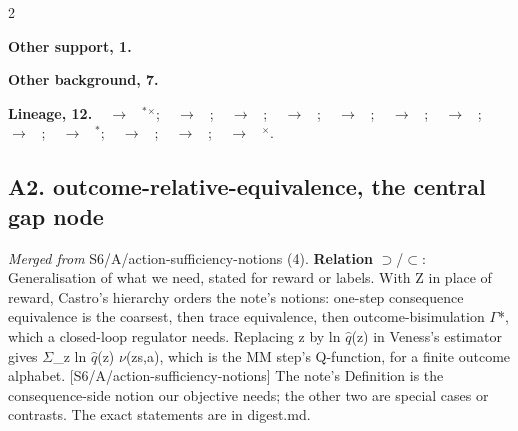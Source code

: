 \documentclass[10pt]{article}
\newcommand{\memb}[1]{\par\smallskip\textbf{#1}\quad}
\begin{document}
\begin{multicols}{2}
\memb{Other support, 1.} \citetext{\citealp{Chen-counterfactual26}}

\memb{Other background, 7.} {\footnotesize \citetext{\citealp{Boutilier-decisiontheoretic99}; \citealp{Boutilier-stochastic00}; \citealp{Soatto-steps11}; \citealp{Baram-deep16}; \citealp{Corneil-efficient18}; \citealp{Biza-learning20}; \citealp{An-diagnosing26}}}

\end{multicols}
\memb{Lineage, 12.} {\footnotesize \citeauthor{Conant-good70}~\citeyear{Conant-good70} $\to$ \citeauthor{Li-towards06}~\citeyear{Li-towards06}$^\ast$$^\times$; \citeauthor{Larsen-bisimulation91}~\citeyear{Larsen-bisimulation91} $\to$ \citeauthor{Desharnais-bisimulation02}~\citeyear{Desharnais-bisimulation02}; \citeauthor{Larsen-bisimulation91}~\citeyear{Larsen-bisimulation91} $\to$ \citeauthor{Givan-equivalence03}~\citeyear{Givan-equivalence03}; \citeauthor{Givan-equivalence03}~\citeyear{Givan-equivalence03} $\to$ \citeauthor{Ferns-metrics04}~\citeyear{Ferns-metrics04}; \citeauthor{Givan-equivalence03}~\citeyear{Givan-equivalence03} $\to$ \citeauthor{Li-towards06}~\citeyear{Li-towards06}; \citeauthor{Ferns-metrics04}~\citeyear{Ferns-metrics04} $\to$ \citeauthor{Castro-equivalence09}~\citeyear{Castro-equivalence09}; \citeauthor{Ferns-metrics04}~\citeyear{Ferns-metrics04} $\to$ \citeauthor{Zhang-learning21}~\citeyear{Zhang-learning21}; \citeauthor{Li-towards06}~\citeyear{Li-towards06} $\to$ \citeauthor{Ni-bridging24}~\citeyear{Ni-bridging24}; \citeauthor{Li-towards06}~\citeyear{Li-towards06} $\to$ \citeauthor{Chen-counterfactual26}~\citeyear{Chen-counterfactual26}$^\ast$; \citeauthor{Castro-equivalence09}~\citeyear{Castro-equivalence09} $\to$ \citeauthor{Zhang-compositional26}~\citeyear{Zhang-compositional26}; \citeauthor{Zhang-learning21}~\citeyear{Zhang-learning21} $\to$ \citeauthor{Castro-mico21}~\citeyear{Castro-mico21}; \citeauthor{Weinstein-internal24}~\citeyear{Weinstein-internal24} $\to$ \citeauthor{Larsen-bisimulation91}~\citeyear{Larsen-bisimulation91}$^\times$.}

\subsection{A2. outcome-relative-equivalence, the central gap node}\label{node:S6-S6-A-outcome-relative-equivalence}
\textit{Merged from} S6/A/action-sufficiency-notions (4). \textbf{Relation} $\supset$/$\subset$: Generalisation of what we need, stated for reward or labels. With Z in place of reward, Castro's hierarchy orders the note's notions: one-step consequence equivalence is the coarsest, then trace equivalence, then outcome-bisimulation \ensuremath{\Gamma}*, which a closed-loop regulator needs. Replacing z by ln \ensuremath{\hat{q}}(z) in Veness's estimator gives \ensuremath{\Sigma}\_z ln \ensuremath{\hat{q}}(z) \ensuremath{\nu}(z\textbar{}s,a), which is the MM step's Q-function, for a finite outcome alphabet. [S6/A/action-sufficiency-notions] The note's Definition is the consequence-side notion our objective needs; the other two are special cases or contrasts. The exact statements are in digest.md.
\end{document}
